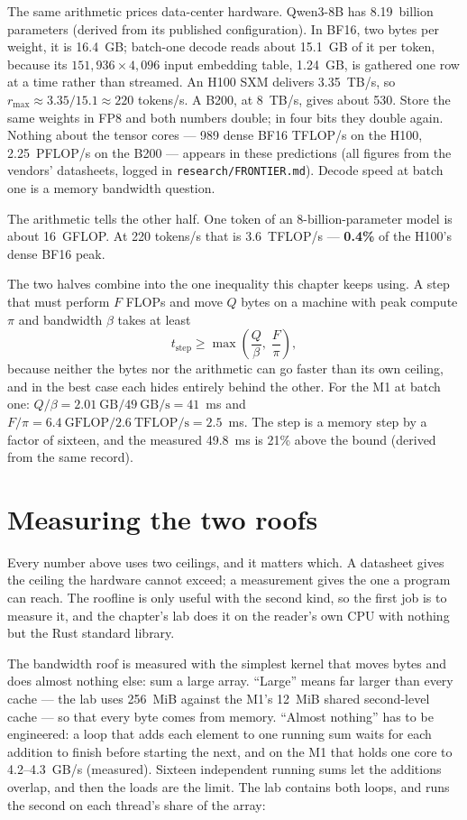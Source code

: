 The same arithmetic prices data-center hardware. Qwen3-8B has 8.19~billion
parameters (derived from its published configuration). In BF16, two bytes per
weight, it is 16.4~GB; batch-one decode reads about 15.1~GB of it per token,
because its $151{,}936\times4{,}096$ input embedding table, 1.24~GB, is
gathered one row at a time rather than streamed. An H100 SXM delivers
3.35~TB/s, so $r_{\max}\approx 3.35/15.1 \approx 220$ tokens/s. A B200,
at 8~TB/s, gives about 530. Store the same weights in FP8 and both numbers
double; in four bits they double again. Nothing about the tensor cores ---
989 dense BF16 TFLOP/s on the H100, 2.25~PFLOP/s on the B200 --- appears in
these predictions (all figures from the vendors' datasheets, logged in
\texttt{research/FRONTIER.md}). Decode speed at batch one is a memory
bandwidth question.

The arithmetic tells the other half. One token of an 8-billion-parameter model
is about 16~GFLOP. At 220 tokens/s that is 3.6~TFLOP/s --- \textbf{0.4\%} of
the H100's dense BF16 peak.

The two halves combine into the one inequality this chapter keeps using. A
step that must perform $F$ FLOPs and move $Q$ bytes on a machine with peak
compute $\pi$ and bandwidth $\beta$ takes at least
\begin{equation}
t_{\text{step}} \ge \max\!\left(\frac{Q}{\beta},\; \frac{F}{\pi}\right),
\label{eq:step-bound}
\end{equation}
because neither the bytes nor the arithmetic can go faster than its own
ceiling, and in the best case each hides entirely behind the other. For the
M1 at batch one: $Q/\beta = 2.01~\text{GB} / 49~\text{GB/s} = 41$~ms and
$F/\pi = 6.4~\text{GFLOP} / 2.6~\text{TFLOP/s} = 2.5$~ms. The step is a
memory step by a factor of sixteen, and the measured 49.8~ms is 21\% above the
bound (derived from the same record).

\section{Measuring the two roofs}

Every number above uses two ceilings, and it matters which. A datasheet gives
the ceiling the hardware cannot exceed; a measurement gives the one a program
can reach. The roofline is only useful with the second kind, so the first job
is to measure it, and the chapter's lab does it on the reader's own CPU with
nothing but the Rust standard library.

The bandwidth roof is measured with the simplest kernel that moves bytes and
does almost nothing else: sum a large array. ``Large'' means far larger than
every cache --- the lab uses 256~MiB against the M1's 12~MiB shared
second-level cache --- so that every byte comes from memory. ``Almost
nothing'' has to be engineered: a loop that adds each element to one running
sum waits for each addition to finish before starting the next, and on the M1
that holds one core to 4.2--4.3~GB/s (measured). Sixteen independent running
sums let the additions overlap, and then the loads are the limit. The lab
contains both loops, and runs the second on each thread's share of the array:

